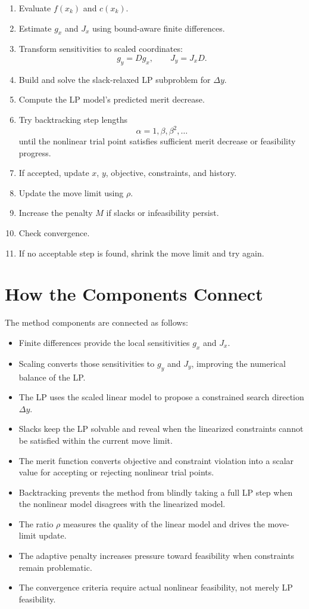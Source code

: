 \documentclass[11pt,a4paper]{article}
\begin{document}
\begin{enumerate}
    \item Evaluate \(f(x_k)\) and \(c(x_k)\).
    \item Estimate \(g_x\) and \(J_x\) using bound-aware finite differences.
    \item Transform sensitivities to scaled coordinates:
    \[
        g_y = Dg_x, \qquad J_y = J_xD.
    \]
    \item Build and solve the slack-relaxed LP subproblem for \(\Delta y\).
    \item Compute the LP model's predicted merit decrease.
    \item Try backtracking step lengths
    \[
        \alpha = 1, \beta, \beta^2, \dots
    \]
    until the nonlinear trial point satisfies sufficient merit decrease or
    feasibility progress.
    \item If accepted, update \(x\), \(y\), objective, constraints, and history.
    \item Update the move limit using \(\rho\).
    \item Increase the penalty \(M\) if slacks or infeasibility persist.
    \item Check convergence.
    \item If no acceptable step is found, shrink the move limit and try again.
\end{enumerate}

\section{How the Components Connect}

The method components are connected as follows:

\begin{itemize}
    \item Finite differences provide the local sensitivities \(g_x\) and \(J_x\).
    \item Scaling converts those sensitivities to \(g_y\) and \(J_y\), improving
    the numerical balance of the LP.
    \item The LP uses the scaled linear model to propose a constrained search
    direction \(\Delta y\).
    \item Slacks keep the LP solvable and reveal when the linearized constraints
    cannot be satisfied within the current move limit.
    \item The merit function converts objective and constraint violation into a
    scalar value for accepting or rejecting nonlinear trial points.
    \item Backtracking prevents the method from blindly taking a full LP step
    when the nonlinear model disagrees with the linearized model.
    \item The ratio \(\rho\) measures the quality of the linear model and drives
    the move-limit update.
    \item The adaptive penalty increases pressure toward feasibility when
    constraints remain problematic.
    \item The convergence criteria require actual nonlinear feasibility, not
    merely LP feasibility.
\end{itemize}
\end{document}
